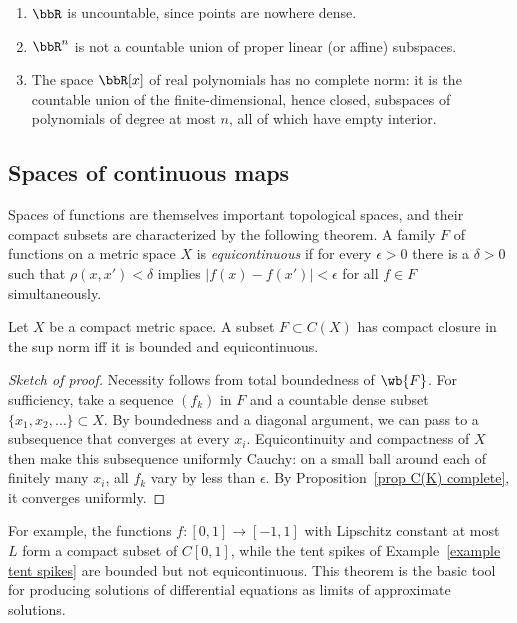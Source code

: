 \begin{example}\label{example Baire}
    \begin{enumerate}
        \item $\bbR$ is uncountable, since points are nowhere dense.
        \item $\bbR^n$ is not a countable union of proper linear (or affine) subspaces.
        \item The space $\bbR[x]$ of real polynomials has no complete norm: it is the countable union of the finite-dimensional, hence closed, subspaces of polynomials of degree at most $n$, all of which have empty interior.
    \end{enumerate}
\end{example}

\subsection{Spaces of continuous maps}

Spaces of functions are themselves important topological spaces, and their compact subsets are characterized by the following theorem. A family $F$ of functions on a metric space $X$ is \emph{equicontinuous} if for every $\epsilon>0$ there is a $\delta>0$ such that $\rho(x,x')<\delta$ implies $\lvert f(x)-f(x')\rvert<\epsilon$ for all $f\in F$ simultaneously.

\begin{thm}\label{thm Arzela-Ascoli}
    Let $X$ be a compact metric space. A subset $F\subset C(X)$ has compact closure in the sup norm iff it is bounded and equicontinuous.
\end{thm}
\begin{proof}[Sketch of proof]
    Necessity follows from total boundedness of $\wb{F}$. For sufficiency, take a sequence $(f_k)$ in $F$ and a countable dense subset $\{x_1,x_2,\ldots\}\subset X$. By boundedness and a diagonal argument, we can pass to a subsequence that converges at every $x_i$. Equicontinuity and compactness of $X$ then make this subsequence uniformly Cauchy: on a small ball around each of finitely many $x_i$, all $f_k$ vary by less than $\epsilon$. By Proposition~\ref{prop C(K) complete}, it converges uniformly.
\end{proof}

For example, the functions $f:[0,1]\to[-1,1]$ with Lipschitz constant at most $L$ form a compact subset of $C[0,1]$, while the tent spikes of Example~\ref{example tent spikes} are bounded but not equicontinuous. This theorem is the basic tool for producing solutions of differential equations as limits of approximate solutions.

